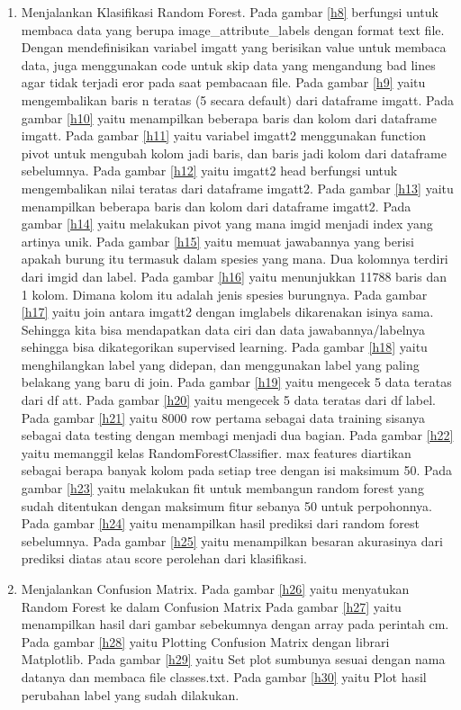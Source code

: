 \begin{enumerate}
\item Menjalankan Klasifikasi Random Forest.
\subitem Pada gambar \ref{h8} berfungsi untuk membaca data yang berupa image\_attribute\_labels dengan format text file. Dengan mendefinisikan variabel imgatt yang berisikan value untuk membaca data, juga menggunakan code untuk skip data yang mengandung bad lines agar tidak terjadi eror pada saat pembacaan file.
\subitem Pada gambar \ref{h9} yaitu mengembalikan baris n teratas (5 secara default) dari dataframe imgatt.
\subitem Pada gambar \ref{h10} yaitu menampilkan beberapa baris dan kolom dari dataframe imgatt.
\subitem Pada gambar \ref{h11} yaitu variabel imgatt2 menggunakan function pivot untuk mengubah kolom jadi baris, dan baris jadi kolom dari dataframe sebelumnya.
\subitem Pada gambar \ref{h12} yaitu imgatt2 head berfungsi untuk mengembalikan nilai teratas dari dataframe imgatt2.
\subitem Pada gambar \ref{h13} yaitu menampilkan beberapa baris dan kolom dari dataframe imgatt2. 
\subitem Pada gambar \ref{h14} yaitu melakukan pivot yang mana imgid menjadi index yang artinya unik.
\subitem Pada gambar \ref{h15} yaitu memuat jawabannya yang berisi apakah burung itu termasuk dalam spesies yang mana. Dua kolomnya terdiri dari imgid dan label.
\subitem Pada gambar \ref{h16} yaitu menunjukkan 11788 baris dan 1 kolom. Dimana kolom itu adalah jenis spesies burungnya.
\subitem Pada gambar \ref{h17} yaitu join antara imgatt2 dengan imglabels dikarenakan isinya sama. Sehingga kita bisa mendapatkan data ciri dan data jawabannya/labelnya sehingga bisa dikategorikan supervised learning.
\subitem Pada gambar \ref{h18} yaitu menghilangkan label yang didepan, dan menggunakan label yang paling belakang yang baru di join.
\subitem Pada gambar \ref{h19} yaitu mengecek 5 data teratas dari df att.
\subitem Pada gambar \ref{h20} yaitu mengecek 5 data teratas dari df label.
\subitem Pada gambar \ref{h21} yaitu 8000 row pertama sebagai data training sisanya sebagai data testing dengan membagi menjadi dua bagian.
\subitem Pada gambar \ref{h22} yaitu memanggil kelas RandomForestClassifier. max features diartikan sebagai berapa banyak kolom pada setiap tree dengan isi maksimum 50.
\subitem Pada gambar \ref{h23} yaitu melakukan fit untuk membangun random forest yang sudah ditentukan dengan maksimum fitur sebanya 50 untuk perpohonnya.
\subitem Pada gambar \ref{h24} yaitu menampilkan hasil prediksi dari random forest sebelumnya.
\subitem Pada gambar \ref{h25} yaitu menampilkan besaran akurasinya dari prediksi diatas atau score perolehan dari klasifikasi.

\item Menjalankan Confusion Matrix.
\subitem Pada gambar \ref{h26} yaitu menyatukan Random Forest ke dalam Confusion Matrix
\subitem Pada gambar \ref{h27} yaitu menampilkan hasil dari gambar sebekumnya dengan array pada perintah cm.
\subitem Pada gambar \ref{h28} yaitu Plotting Confusion Matrix dengan librari Matplotlib.
\subitem Pada gambar \ref{h29} yaitu Set plot sumbunya sesuai dengan nama datanya dan membaca file classes.txt.
\subitem Pada gambar \ref{h30} yaitu Plot hasil perubahan label yang sudah dilakukan.


\end{enumerate}
